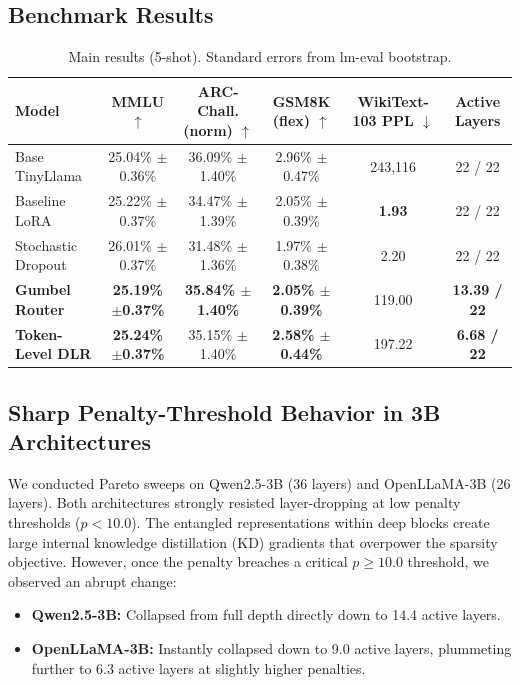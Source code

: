 \documentclass[conference]{IEEEtran}
\begin{document}
\subsection{Benchmark Results}
\begin{table}[t]
\centering
\caption{Main results (5-shot). Standard errors from lm-eval bootstrap.}
\begin{tabular}{@{}lccccc@{}}
\toprule
Model & MMLU $\uparrow$ & ARC-Chall. (norm) $\uparrow$ & GSM8K (flex) $\uparrow$ & WikiText-103 PPL $\downarrow$ & Active Layers \\ \midrule
Base TinyLlama & 25.04\% $\pm$0.36\% & 36.09\% $\pm$1.40\% & 2.96\% $\pm$0.47\% & 243,116 & 22 / 22 \\
Baseline LoRA & 25.22\% $\pm$0.37\% & 34.47\% $\pm$1.39\% & 2.05\% $\pm$0.39\% & \textbf{1.93} & 22 / 22 \\
Stochastic Dropout & 26.01\% $\pm$0.37\% & 31.48\% $\pm$1.36\% & 1.97\% $\pm$0.38\% & 2.20 & 22 / 22 \\
\textbf{Gumbel Router} & \textbf{25.19\% $\pm$0.37\%} & \textbf{35.84\% $\pm$1.40\%} & \textbf{2.05\% $\pm$0.39\%} & 119.00 & \textbf{13.39 / 22} \\
\textbf{Token-Level DLR} & \textbf{25.24\% $\pm$0.37\%} & 35.15\% $\pm$1.40\% & \textbf{2.58\% $\pm$0.44\%} & 197.22 & \textbf{6.68 / 22} \\ \bottomrule
\end{tabular}
\end{table}

\subsection{Sharp Penalty-Threshold Behavior in 3B Architectures}
We conducted Pareto sweeps on Qwen2.5-3B (36 layers) and OpenLLaMA-3B (26 layers). Both architectures strongly resisted layer-dropping at low penalty thresholds ($p < 10.0$). The entangled representations within deep blocks create large internal knowledge distillation (KD) gradients that overpower the sparsity objective. However, once the penalty breaches a critical $p \ge 10.0$ threshold, we observed an abrupt change:
\begin{itemize}
    \item \textbf{Qwen2.5-3B:} Collapsed from full depth directly down to 14.4 active layers.
    \item \textbf{OpenLLaMA-3B:} Instantly collapsed down to 9.0 active layers, plummeting further to 6.3 active layers at slightly higher penalties.
\end{itemize}
\end{document}

